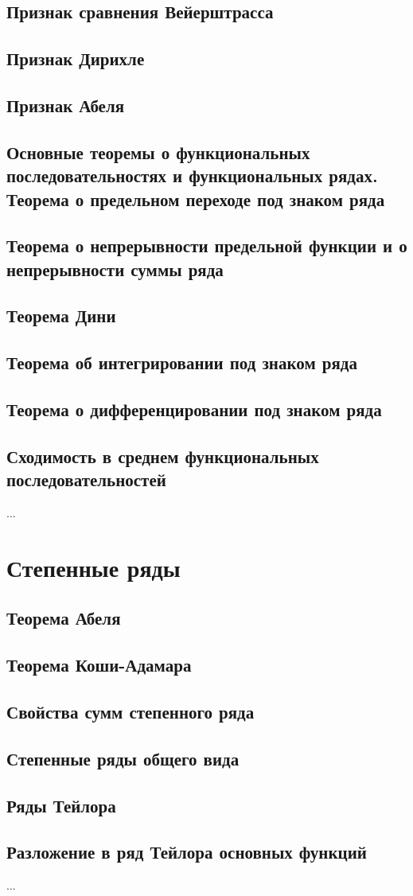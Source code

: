 \subsection{Признак сравнения Вейерштрасса}
\subsection{Признак Дирихле}
\subsection{Признак Абеля}
\subsection{Основные теоремы о  функциональных последовательностях и функциональных рядах. Теорема о предельном переходе под знаком ряда}
\subsection{Теорема о непрерывности предельной функции и о непрерывности суммы ряда}
\subsection{Теорема Дини}
\subsection{Теорема об интегрировании под знаком ряда}
\subsection{Теорема о дифференцировании под знаком ряда}
\subsection{Сходимость в среднем функциональных последовательностей}
...

\section{Степенные ряды}
\subsection{Теорема Абеля}
\subsection{Теорема Коши-Адамара}
\subsection{Свойства сумм степенного ряда}
\subsection{Степенные ряды общего вида}
\subsection{Ряды Тейлора}
\subsection{Разложение в ряд Тейлора основных функций}
...

